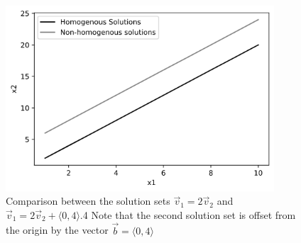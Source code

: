 \documentclass[11pt, a4paper]{article}
\begin{document}
\begin{figure}[h]
  \centerline{\includegraphics[width=10cm]{images/Solution_sets.png}}
  \caption{Comparison between the solution sets $\vec{v}_1 = 2\vec{v}_2$ and $\vec{v}_1 = 2\vec{v}_2 + \langle 0, 4 \rangle$.4
  Note that the second solution set is offset from the origin by the vector $\vec{b} = \langle 0, 4 \rangle$}
\end{figure}
\end{document}
